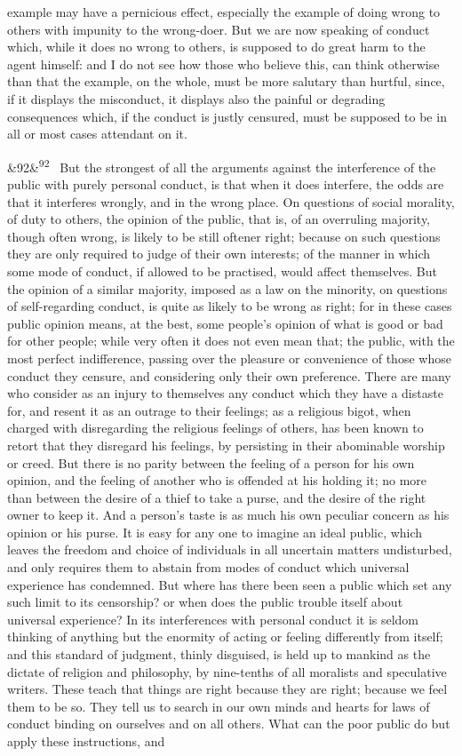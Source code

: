 \documentclass[12pt]{article}
\newcommand{\para}[1][]{\par\noindent\ifx&#1&\else\textsuperscript{\footnotesize #1}~\fi}
\begin{document}
example may have a pernicious effect, especially the example of doing wrong to others with impunity to the wrong-doer. But we are now speaking of conduct which, while it does no wrong to others, is supposed to do great harm to the agent himself: and I do not see how those who believe this, can think otherwise than that the example, on the whole, must be more salutary than hurtful, since, if it displays the misconduct, it displays also the painful or degrading consequences which, if the conduct is justly censured, must be supposed to be in all or most cases attendant on it.

\para[92] But the strongest of all the arguments against the interference of the public with purely personal conduct, is that when it does interfere, the odds are that it interferes wrongly, and in the wrong place. On questions of social morality, of duty to others, the opinion of the public, that is, of an overruling majority, though often wrong, is likely to be still oftener right; because on such questions they are only required to judge of their own interests; of the manner in which some mode of conduct, if allowed to be practised, would affect themselves. But the opinion of a similar majority, imposed as a law on the minority, on questions of self-regarding conduct, is quite as likely to be wrong as right; for in these cases public opinion means, at the best, some people's opinion of what is good or bad for other people; while very often it does not even mean that; the public, with the most perfect indifference, passing over the pleasure or convenience of those whose conduct they censure, and considering only their own preference. There are many who consider as an injury to themselves any conduct which they have a distaste for, and resent it as an outrage to their feelings; as a religious bigot, when charged with disregarding the religious feelings of others, has been known to retort that they disregard his feelings, by persisting in their abominable worship or creed. But there is no parity between the feeling of a person for his own opinion, and the feeling of another who is offended at his holding it; no more than between the desire of a thief to take a purse, and the desire of the right owner to keep it. And a person's taste is as much his own peculiar concern as his opinion or his purse. It is easy for any one to imagine an ideal public, which leaves the freedom and choice of individuals in all uncertain matters undisturbed, and only requires them to abstain from modes of conduct which universal experience has condemned. But where has there been seen a public which set any such limit to its censorship? or when does the public trouble itself about universal experience? In its interferences with personal conduct it is seldom thinking of anything but the enormity of acting or feeling differently from itself; and this standard of judgment, thinly disguised, is held up to mankind as the dictate of religion and philosophy, by nine-tenths of all moralists and speculative writers. These teach that things are right because they are right; because we feel them to be so. They tell us to search in our own minds and hearts for laws of conduct binding on ourselves and on all others. What can the poor public do but apply these instructions, and 
\end{document}
